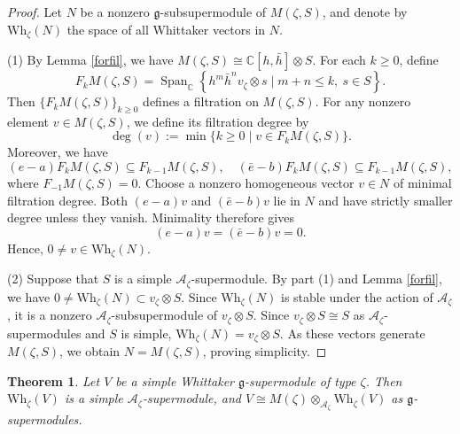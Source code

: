 \documentclass[a4paper,10pt]{article}
\theoremstyle{definition}
\theoremstyle{plain}
\newtheorem{theorem}[definition]{Theorem}
\theoremstyle{remark}
\theoremstyle{mystyle}
\numberwithin{equation}{section}
\begin{document}
\begin{proof}

Let \(N\) be a nonzero \(\mathfrak g\)-subsupermodule of \(M(\zeta,S)\), and denote by $\mathrm{Wh}_{\zeta}(N)$ the space of all Whittaker vectors in $N$.

(1) By Lemma \ref{forfil}, we have $M(\zeta,S)\cong\mathbb C[h,\bar h]\otimes S$. For each \(k\geq0\), define
    \[
        F_kM(\zeta,S)=\operatorname{Span}_{\mathbb C}\left\{h^m\bar h^nv_{\zeta}\otimes s\mid m+n\leq k,\ s\in S\right\}.
    \]
    Then \(\{F_kM(\zeta,S)\}_{k\geq 0}\) defines a filtration on \(M(\zeta,S)\). For any nonzero element \(v\in M(\zeta,S)\), we define its filtration degree by
\[
\deg(v):=\min\{k\geq 0\mid v\in F_kM(\zeta,S)\}.
\]
    Moreover, we have 
    $$
    (e-a)F_kM(\zeta,S)\subseteq F_{k-1}M(\zeta,S),\quad (\bar e-b)F_kM(\zeta,S)\subseteq F_{k-1}M(\zeta,S),
    $$
    where $F_{-1}M(\zeta,S)=0$. Choose a nonzero homogeneous vector \(v\in N\) of minimal filtration degree. Both $(e-a)v$ and $(\bar e-b)v$ lie in $N$ and have strictly smaller degree unless they vanish. Minimality therefore gives
    $$
    (e-a)v=(\bar e-b)v=0.
    $$
    Hence, $0\neq v\in \mathrm{Wh}_{\zeta}(N)$. 
    
(2) Suppose that \(S\) is a simple \(\mathcal A_\zeta\)-supermodule. By part (1) and Lemma \ref{forfil}, we have $0\neq \mathrm{Wh}_{\zeta}(N)\subset v_{\zeta}\otimes S$. Since \(\mathrm{Wh}_{\zeta}(N)\) is stable under the action of \(\mathcal A_\zeta\), it is a nonzero \(\mathcal A_\zeta\)-subsupermodule of \(v_{\zeta}\otimes S\). Since \(v_{\zeta}\otimes S\cong S\) as \(\mathcal A_\zeta\)-supermodules and \(S\) is simple, \(\mathrm{Wh}_{\zeta}(N)=v_{\zeta}\otimes S\). As these vectors generate \(M(\zeta,S)\), we obtain \(N=M(\zeta,S)\), proving simplicity.
\end{proof}
\begin{theorem}\label{Vcong}
    Let $V$ be a simple Whittaker $\mathfrak g$-supermodule of type $\zeta$. Then \(\mathrm{Wh}_{\zeta}(V)\) is a simple \(\mathcal A_\zeta\)-supermodule, and $V\cong M(\zeta)\otimes_{\mathcal A_\zeta}\mathrm{Wh}_{\zeta}(V)$ as \(\mathfrak g\)-supermodules.
\end{theorem}
\end{document}
